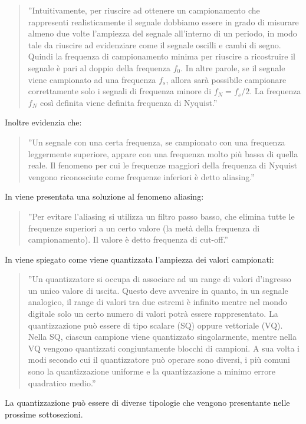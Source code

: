 \documentclass[a4paper]{report} %
\begin{document}
\begin{quote}	
	 ''Intuitivamente, per riuscire ad ottenere un campionamento che rappresenti realisticamente il segnale dobbiamo essere in grado di misurare almeno due volte l'ampiezza del segnale all'interno di un periodo, in modo tale da riuscire ad evidenziare come il segnale oscilli e cambi di segno. Quindi la frequenza di campionamento minima per riuscire a ricostruire il segnale è pari al doppio della frequenza $f_{0}$. In altre parole, se il segnale viene campionato ad una frequenza $f_{s}$, allora sarà possibile campionare correttamente solo i segnali di frequenza minore di $f_{N}=f_{s}/2$. La frequenza $f_{N}$ così definita viene definita frequenza di Nyquist.'' 
\end{quote}
Inoltre \cite{art:rif.2} evidenzia che:
\begin{quote}	 
	 ''Un segnale con una certa frequenza, se campionato con una frequenza leggermente superiore, appare con una frequenza molto più bassa di quella reale. Il fenomeno per cui le frequenze maggiori della frequenza di Nyquist vengono riconosciute come frequenze inferiori è detto aliasing.'' 
\end{quote}

In \cite{art:rif.18} viene presentata una soluzione al fenomeno aliasing:
\begin{quote}
	''Per evitare l'aliasing si utilizza un filtro passo basso, che elimina tutte le frequenze superiori a un certo valore (la metà della frequenza di campionamento). Il valore è detto frequenza di cut-off.''
\end{quote}


In \cite{art:rif.4} viene spiegato come viene quantizzata l'ampiezza dei valori campionati:
\begin{quote}
	''Un quantizzatore si occupa di associare ad un range di valori d'ingresso un unico valore di uscita. Questo deve avvenire in quanto, in un segnale analogico, il range di valori tra due estremi è infinito mentre nel mondo digitale solo un certo numero di valori potrà essere rappresentato. La quantizzazione può essere di tipo scalare (SQ) oppure vettoriale (VQ). Nella SQ, ciascun campione viene quantizzato singolarmente, mentre nella VQ vengono quantizzati congiuntamente blocchi di campioni. A sua volta i modi secondo cui il quantizzatore può operare sono diversi, i più comuni sono la quantizzazione uniforme e la quantizzazione a minimo errore quadratico medio.'' 
\end{quote}
La quantizzazione può essere di diverse tipologie che vengono presentante nelle prossime sottosezioni.
\end{document}
